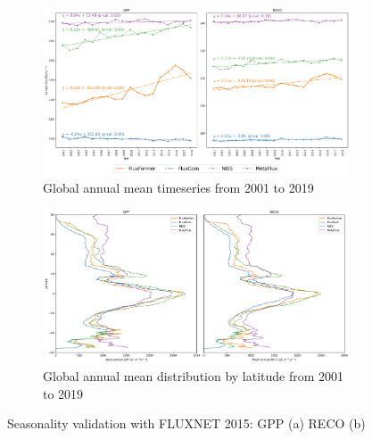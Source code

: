 \begin{figure}[p]
    \centering
    \begin{subfigure}{\textwidth}
      \centering
      \includegraphics[width=\textwidth]{figs/chap6/global_annual_timeseries.png}
      \caption{Global annual mean timeseries from 2001 to 2019}
      \label{fig:chap6_fig7a}
    \end{subfigure}

    \begin{subfigure}{\textwidth}
      \centering
      \includegraphics[width=\textwidth]{figs/chap6/lat_mean.png}
      \caption{Global annual mean distribution by latitude from 2001 to 2019}
      \label{fig:chap6_fig7b}
    \end{subfigure}
    \caption[Seasonality validation with FLUXNET 2015]{Seasonality validation with FLUXNET 2015: GPP (a) RECO (b)}
    \label{fig:chap6_fig7}
\end{figure}

